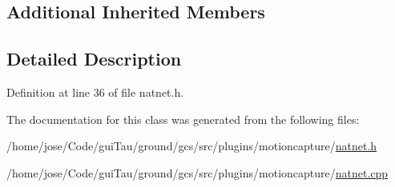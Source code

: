 \subsection*{Additional Inherited Members}


\subsection{Detailed Description}


Definition at line 36 of file natnet.\-h.



The documentation for this class was generated from the following files\-:\begin{DoxyCompactItemize}
\item 
/home/jose/\-Code/gui\-Tau/ground/gcs/src/plugins/motioncapture/\hyperlink{natnet_8h}{natnet.\-h}\item 
/home/jose/\-Code/gui\-Tau/ground/gcs/src/plugins/motioncapture/\hyperlink{natnet_8cpp}{natnet.\-cpp}\end{DoxyCompactItemize}
